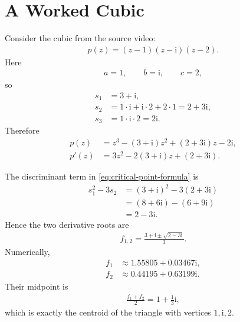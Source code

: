 \documentclass[11pt]{article}
\newcommand{\ii}{\mathrm{i}}
\begin{document}
\section{A Worked Cubic}

Consider the cubic from the source video:
\begin{align}
  p(z)=(z-1)(z-\ii)(z-2).
\end{align}
Here
\begin{align}
  a=1,\qquad b=\ii,\qquad c=2,
\end{align}
so
\begin{align}
  s_1&=3+\ii,\\
  s_2&=1\cdot \ii+\ii\cdot 2+2\cdot 1=2+3\ii,\\
  s_3&=1\cdot \ii\cdot 2=2\ii.
\end{align}
Therefore
\begin{align}
  p(z)
    &=z^3-(3+\ii)z^2+(2+3\ii)z-2\ii,\\
  p'(z)
    &=3z^2-2(3+\ii)z+(2+3\ii).
\end{align}

The discriminant term in \cref{eq:critical-point-formula} is
\begin{align}
  s_1^2-3s_2
    &=(3+\ii)^2-3(2+3\ii)\\
    &=(8+6\ii)-(6+9\ii)\\
    &=2-3\ii.
\end{align}
Hence the two derivative roots are
\begin{align}
  f_{1,2}=\frac{3+\ii\pm\sqrt{2-3\ii}}{3}.
  \label{eq:example-critical-points}
\end{align}
Numerically,
\begin{align}
  f_1&\approx 1.55805+0.03467\ii,\\
  f_2&\approx 0.44195+0.63199\ii.
\end{align}
Their midpoint is
\begin{align}
  \frac{f_1+f_2}{2}=1+\frac{1}{3}\ii,
\end{align}
which is exactly the centroid of the triangle with vertices \(1,\ii,2\).
\end{document}
